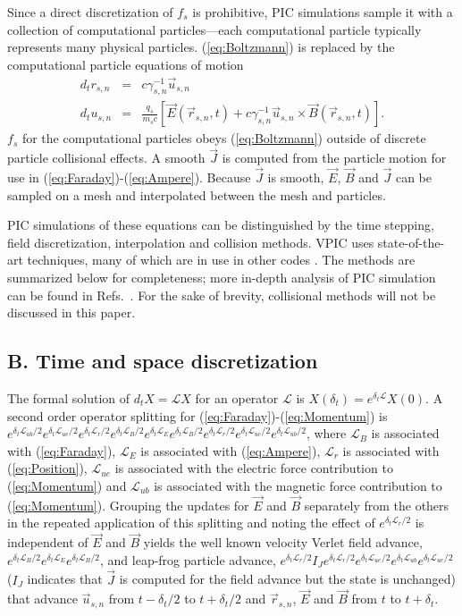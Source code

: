 \documentclass[aps,prl,preprint,preprintnumbers,groupedaddress]{revtex4}
\newcommand{\vecr}{\vec{r}}
\newcommand{\vecu}{\vec{u}}
\newcommand{\vecJ}{\vec{J}}
\newcommand{\vecE}{\vec{E}}
\newcommand{\vecB}{\vec{B}}
\newcommand{\op}{\mathcal{L}}
\newcommand{\Deriv}[2]{d_{#2}#1}
\newcommand{\CrossP}[2]{#1 \times #2}
\newcommand{\eq}[1]{(\ref{eq:#1})}
\begin{document}
Since a direct discretization of $f_s$ is prohibitive, PIC simulations
sample it with a collection of computational particles---each
computational particle typically represents many physical particles.
\eq{Boltzmann} is replaced by the computational particle
equations of motion
\begin{eqnarray}
\Deriv{r_{s,n}}{t} &=& c \gamma_{s,n}^{-1} \vecu_{s,n} \label{eq:Position}\\
\Deriv{u_{s,n}}{t} &=& \frac{q_s}{m_s c} \left[
\vecE\left(\vecr_{s,n},t\right) +
\CrossP{c\gamma_{s,n}^{-1}\vecu_{s,n}}{\vecB\left(\vecr_{s,n},t\right)}
\right] \label{eq:Momentum}
.
\end{eqnarray}
$f_s$ for the computational particles obeys \eq{Boltzmann} outside of
discrete particle collisional effects.  A smooth $\vecJ$ is computed
from the particle motion for use in \eq{Faraday}-\eq{Ampere}.  Because
$\vecJ$ is smooth, $\vecE$, $\vecB$ and $\vecJ$ can be sampled on a
mesh and interpolated between the mesh and particles.

PIC simulations of these equations can be distinguished by the time
stepping, field discretization, interpolation and collision methods.
VPIC uses state-of-the-art techniques, many of which are in use in
other codes
\cite{Kwan_Snell_1985,Verboncoeur_et_al_1995,Eastwood_et_al_1995,Jones_et_al_1996,Blahovec_et_al_2000,Nieter_Cary_2004}.
The methods are summarized below for completeness; more in-depth
analysis of PIC simulation can be found in
Refs.~\cite{Birdsall_Langdon_1985,Hockney_Eastwood_1988}.  For the
sake of brevity, collisional methods will not be discussed in this
paper.

\subsection{B. Time and space discretization}

The formal solution of $\Deriv{X}{t} = \op X$ for an operator $\op$ is
$X\left(\delta_t\right) = e^{\delta_t\op} X\left(0\right)$.  A second
order operator splitting \cite{McLachlan_Quispel_2002} for
\eq{Faraday}-\eq{Momentum} is
$e^{\delta_t\op_{ub}/2} e^{\delta_t\op_{ue}/2} e^{\delta_t\op_r/2}
e^{\delta_t\op_B/2}e^{\delta_t\op_E} e^{\delta_t\op_B/2}
e^{\delta_t\op_r/2} e^{\delta_t\op_{ue}/2} e^{\delta_t\op_{ub}/2}$,
where $\op_B$ is associated with \eq{Faraday}, $\op_E$ is associated
with \eq{Ampere}, $\op_r$ is associated with \eq{Position}, $\op_{ue}$
is associated with the electric force contribution to \eq{Momentum}
and $\op_{ub}$ is associated with the magnetic force contribution to
\eq{Momentum}.  Grouping the updates for $\vecE$ and $\vecB$ separately
from the others in the repeated application of this splitting and
noting the effect of $e^{\delta_t\op_r/2}$ is independent of $\vecE$
and $\vecB$ yields the well known velocity Verlet field advance,
$e^{\delta_t\op_B/2} e^{\delta_t\op_E} e^{\delta_t\op_B/2}$, and
leap-frog particle advance, $e^{\delta_t\op_r/2} I_J
e^{\delta_t\op_r/2} e^{\delta_t\op_{ue}/2} e^{\delta_t\op_{ub}}
e^{\delta_t\op_{ue}/2}$ ($I_J$ indicates that $\vecJ$ is computed for
the field advance but the state is unchanged) that advance
$\vecu_{s,n}$ from $t-\delta_t/2$ to $t+\delta_t/2$ and $\vecr_{s,n}$,
$\vecE$ and $\vecB$ from $t$ to $t+\delta_t$.
\end{document}
